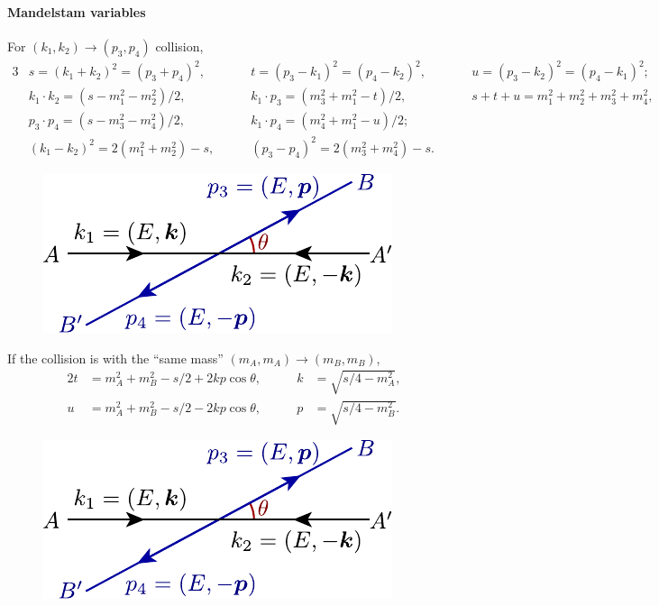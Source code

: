 \documentclass[CheatSheet]{subfiles}
\begin{document}
\paragraph{Mandelstam variables} For $(k_1,k_2)\to(p_3,p_4)$ collision,
\begin{alignat*}{3}
 &s = (k_1+k_2)^2 = (p_3+p_4)^2, \qquad
 &&t = (p_3-k_1)^2 = (p_4-k_2)^2, \qquad
 &&u = (p_3-k_2)^2 = (p_4-k_1)^2;\\
 & k_1\cdot k_2 = (s-m_1^2-m_2^2)/2,
 &&k_1\cdot p_3 = (m_3^2 + m_1^2 - t)/2,
 && s+t+u=m_1^2+m_2^2+m_3^2+m_4^2,\\
 & p_3\cdot p_4 = (s-m_3^2-m_4^2)/2,
 &&k_1\cdot p_4 = (m_4^2 + m_1^2 - u)/2;
 \\&(k_1-k_2)^2 =  2(m_1^2+m_2^2)-s,
  &&(p_3-p_4)^2 = 2(m_3^2 + m_4^2) - s.
\end{alignat*}

\begin{figure}\vspace{-2em}
 \includegraphics[width=\linewidth,page=1]{figs/collision.pdf}
\end{figure}

\noindent
If the collision is with the ``same mass'' $(m_A,m_A)\to (m_B,m_B)$,
\begin{alignat*}{2}
t &= m_A^2+m_B^2 - s/2+2kp\cos\theta,\qquad
&k&={\sqrt{s/4-m_A^2}},\\
u &= m_A^2+m_B^2 - s/2-2kp\cos\theta,
&p&={\sqrt{s/4-m_B^2}}.
\end{alignat*}

\begin{figure}\vspace{-2em}
 \includegraphics[width=\linewidth,page=2]{figs/collision.pdf}
\end{figure}
\end{document}
